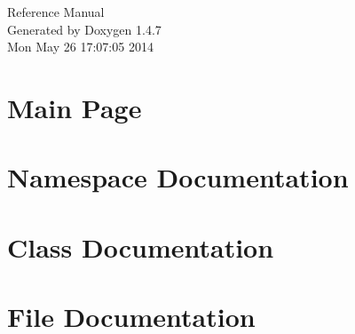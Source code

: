 \documentclass[a4paper]{article}
\begin{document}
\begin{titlepage}
\vspace*{7cm}
\begin{center}
{\Large Reference Manual}\\
\vspace*{1cm}
{\large Generated by Doxygen 1.4.7}\\
\vspace*{0.5cm}
{\small Mon May 26 17:07:05 2014}\\
\end{center}
\end{titlepage}
\tableofcontents
{}
\section{Main Page}
\label{index}\hypertarget{index}{}
\section{Namespace Documentation}

\section{Class Documentation}



\section{File Documentation}





\printindex
\end{document}
